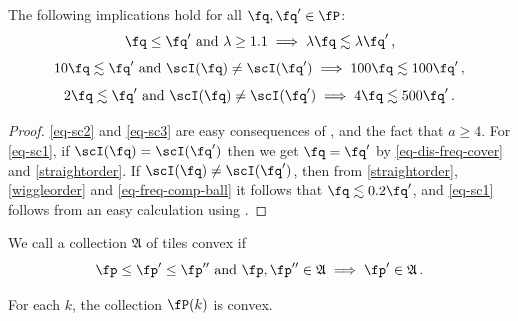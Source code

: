 \begin{lemma}
\label{wiggle-order-3}
\leanok
{}
    The following implications hold for all $\fq, \fq' \in \fP$:
    \begin{equation}
        \label{eq-sc1}
        \fq \le \fq' \ \text{and} \ \lambda \ge 1.1 \implies \lambda \fq \lesssim \lambda \fq'\,,
    \end{equation}
    \begin{equation}
        \label{eq-sc2}
        10\fq \lesssim \fq' \ \text{and} \ \scI(\fq) \ne \scI(\fq') \implies 100 \fq \lesssim 100 \fq'\,,
    \end{equation}
    \begin{equation}
        \label{eq-sc3}
        2\fq \lesssim \fq' \ \text{and} \ \scI(\fq) \ne \scI(\fq') \implies 4 \fq \lesssim 500 \fq'\,.
    \end{equation}
\end{lemma}

\begin{proof}
    \leanok
    \eqref{eq-sc2} and \eqref{eq-sc3} are easy consequences of ,  and the fact that $a \ge 4$.
    For \eqref{eq-sc1}, if $\scI(\fq) = \scI(\fq')$ then
    we get $\fq = \fq'$ by \eqref{eq-dis-freq-cover} and \eqref{straightorder}.
    If $\scI(\fq) \ne \scI(\fq')$, then from \eqref{straightorder},
    \eqref{wiggleorder} and \eqref{eq-freq-comp-ball} it follows that
    $\fq \lesssim 0.2\fq'$, and \eqref{eq-sc1} follows from an easy calculation using
    .
\end{proof}



We call a collection $\mathfrak{A}$ of tiles convex if
\begin{equation}
    \label{eq-convexity}
    \fp \le \fp' \le \fp'' \ \text{and} \ \fp, \fp'' \in \mathfrak{A} \implies \fp' \in \mathfrak{A}\,.
\end{equation}

\begin{lemma}[P convex]
    \label{P-convex}
    \leanok

    For each $k$, the collection $\fP(k)$ is convex.
\end{lemma}

